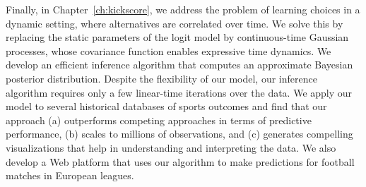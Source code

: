 Finally, in Chapter~\ref{ch:kickscore}, we address the problem of learning choices in a dynamic setting, where alternatives are correlated over time.
We solve this by replacing the static parameters of the logit model by continuous-time Gaussian processes, whose covariance function enables expressive time dynamics.
We develop an efficient inference algorithm that computes an approximate Bayesian posterior distribution.
Despite the flexibility of our model, our inference algorithm requires only a few linear-time iterations over the data.
We apply our model to several historical databases of sports outcomes and find that our approach (a) outperforms competing approaches in terms of predictive performance, (b) scales to millions of observations, and (c) generates compelling visualizations that help in understanding and interpreting the data.
We also develop a Web platform that uses our algorithm to make predictions for football matches in European leagues.
